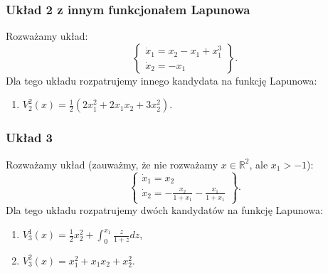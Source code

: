 \documentclass{sprawozdanie-agh}
\begin{document}
        \subsubsection{Układ 2 z innym funkcjonałem Lapunowa}
        Rozważamy układ:
        \begin{equation}
            \label{eq:zadania_przyklad_2}
            \left\{
            \begin{array}{l}
                 \dot{x}_{1} = x_{2} - x_{1} + x_{1}^{3}\\
                 \dot{x}_{2} = -x_{1}
            \end{array}
            \right\}.
        \end{equation}
        Dla tego układu rozpatrujemy innego kandydata na funkcję Lapunowa:
        \begin{enumerate}[label=(\alph*)]

            \item $V_{2}^{2}(x) = \frac{1}{2} \left( 2x_{1}^{2} + 2x_{1}x_{2} + 3x_{2}^{2} \right)$.
        \end{enumerate}

        \subsubsection{Układ 3}
        Rozważamy układ (zauważmy, że nie rozważamy $x\in \mathbb{R}^{2}$, ale $x_{1} > -1$):
        \begin{equation}
            \label{eq:zadania_przyklad_3}
            \left\{
            \begin{array}{l}
                 \dot{x}_{1} = x_{2}\\
                 \dot{x}_{2} = -\frac{x_{2}}{1 + x_{1}} - \frac{x_{1}}{1 + x_{1}}
            \end{array}
            \right\}.
        \end{equation}
        Dla tego układu rozpatrujemy dwóch kandydatów na funkcję Lapunowa:
        \begin{enumerate}[label=(\alph*)]
            \item $V_{3}^{1}(x) = \frac{1}{2}x_{2}^{2} + \int_{0}^{x_{1}}{\frac{z}{1+z}dz}$,
            \item $V_{3}^{2}(x) = x_{1}^{2} + x_{1}x_{2} + x_{2}^{2}$.
        \end{enumerate}
\end{document}
